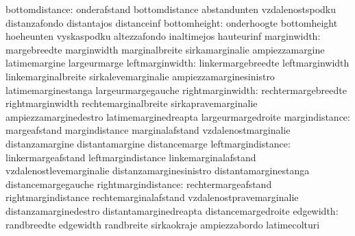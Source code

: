                   bottomdistance: onderafstand                     bottomdistance
                                  abstandunten                     vzdalenostspodku
                                  distanzafondo                    distantajos
                                  distanceinf
                    bottomheight: onderhoogte                      bottomheight
                                  hoeheunten                       vyskaspodku
                                  altezzafondo                     inaltimejos
                                  hauteurinf
                     marginwidth: margebreedte                     marginwidth
                                  marginalbreite                   sirkamarginalie
                                  ampiezzamargine                  latimemargine
                                  largeurmarge
                 leftmarginwidth: linkermargebreedte               leftmarginwidth
                                  linkemarginalbreite              sirkalevemarginalie
                                  ampiezzamarginesinistro          latimemarginestanga
                                  largeurmargegauche
                rightmarginwidth: rechtermargebreedte              rightmarginwidth
                                  rechtemarginalbreite             sirkapravemarginalie
                                  ampiezzamarginedestro            latimemarginedreapta
                                  largeurmargedroite
                  margindistance: margeafstand                     margindistance
                                  marginalafstand                  vzdalenostmarginalie
                                  distanzamargine                  distantamargine
                                  distancemarge
              leftmargindistance: linkermargeafstand               leftmargindistance
                                  linkemarginalafstand             vzdalenostlevemarginalie
                                  distanzamarginesinistro          distantamarginestanga
                                  distancemargegauche
             rightmargindistance: rechtermargeafstand              rightmargindistance
                                  rechtemarginalafstand            vzdalenostpravemarginalie
                                  distanzamarginedestro            distantamarginedreapta
                                  distancemargedroite
                       edgewidth: randbreedte                      edgewidth
                                  randbreite                       sirkaokraje
                                  ampiezzabordo                    latimecolturi
